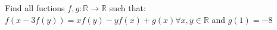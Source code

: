 Find all fuctions $f,g:\mathbb{R}\rightarrow \mathbb{R}$ such that:
$f(x-3f(y))=xf(y)-yf(x)+g(x) \forall x,y\in\mathbb{R}$
and $g(1)=-8$